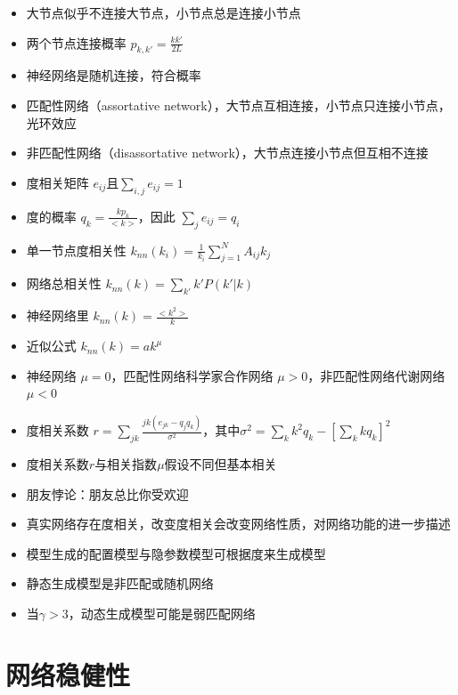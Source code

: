 \documentclass[
]{book}
\providecommand{\tightlist}{%
  \setlength{\itemsep}{0pt}\setlength{\parskip}{0pt}}
\begin{document}
\begin{itemize}
\tightlist
\item
  大节点似乎不连接大节点，小节点总是连接小节点
\item
  两个节点连接概率 \(p_{k,k'} = \frac{kk'}{2L}\)
\item
  神经网络是随机连接，符合概率
\item
  匹配性网络（assortative network），大节点互相连接，小节点只连接小节点，光环效应
\item
  非匹配性网络（disassortative network），大节点连接小节点但互相不连接
\item
  度相关矩阵 \(e_{ij}\)且\(\sum_{i,j}e_{ij} = 1\)
\item
  度的概率 \(q_k = \frac{kp_k}{<k>}\)，因此 \(\sum_je_{ij} = q_i\)
\item
  单一节点度相关性 \(k_{nn}(k_i) = \frac{1}{k_i}\sum_{j=1}^NA_{ij}k_j\)
\item
  网络总相关性 \(k_{nn}(k) = \sum_{k'}k'P(k'|k)\)
\item
  神经网络里 \(k_{nn}(k)=\frac{<k^2>}{k}\)
\item
  近似公式 \(k_{nn}(k)=ak^{\mu}\)
\item
  神经网络 \(\mu = 0\)，匹配性网络科学家合作网络 \(\mu>0\)，非匹配性网络代谢网络 \(\mu<0\)
\item
  度相关系数 \(r=\sum_{jk}\frac{jk(e_{jk}-q_{j}q_{k})}{\sigma^2}\)，其中\(\sigma^2=\sum_{k}k^2q_k - [\sum_kkq_k]^2\)
\item
  度相关系数\(r\)与相关指数\(\mu\)假设不同但基本相关
\item
  朋友悖论：朋友总比你受欢迎
\item
  真实网络存在度相关，改变度相关会改变网络性质，对网络功能的进一步描述
\item
  模型生成的配置模型与隐参数模型可根据度来生成模型
\item
  静态生成模型是非匹配或随机网络
\item
  当\(\gamma>3\)，动态生成模型可能是弱匹配网络
\end{itemize}

\hypertarget{ux7f51ux7edcux7a33ux5065ux6027}{%
\section{网络稳健性}\label{ux7f51ux7edcux7a33ux5065ux6027}}
\end{document}
